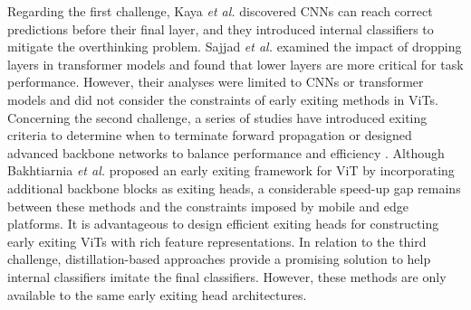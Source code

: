 Regarding the first challenge,
Kaya \textit{et al.} \cite{SDN} discovered CNNs can reach correct predictions before their final layer, 
and they introduced internal classifiers to mitigate the overthinking problem. 
Sajjad \textit{et al.} \cite{DBLP:journals/csl/SajjadDDN23} examined the impact of dropping layers in transformer models and found that lower layers are more critical for task performance. 
However, their analyses were limited to CNNs or transformer models and did not consider the constraints of early exiting methods in ViTs. 
Concerning the second challenge, a series of studies have introduced exiting criteria to determine when to terminate forward propagation \cite{PCEE, hash} or 
designed advanced backbone networks to balance performance and efficiency \cite{branchynet, ztw}. 
Although Bakhtiarnia \textit{et al.} \cite{ViT-EE} proposed an early exiting framework for ViT by incorporating additional backbone blocks as exiting heads, 
a considerable speed-up gap remains between these methods and the constraints imposed by mobile and edge platforms. 
It is advantageous to design efficient exiting heads for constructing early exiting ViTs with rich feature representations. 
In relation to the third challenge, 
distillation-based \cite{fastbert,self-distill} approaches provide a promising solution to help internal classifiers imitate the final classifiers. 
However, these methods are only available to the same early exiting head architectures. 


